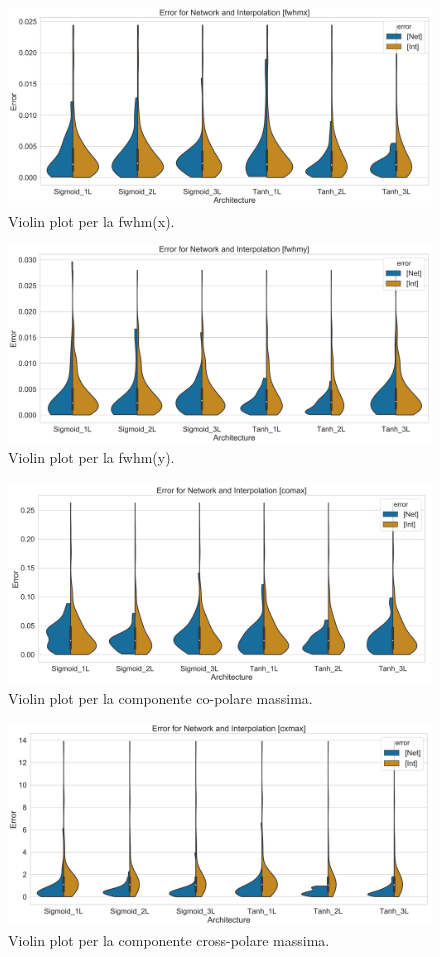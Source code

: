 \documentclass[12pt,a4paper,final]{book}
\begin{document}
\begin{figure}[!ht]
    \centering
    \includegraphics[width=0.8\linewidth]{../figures/violin_plot_fwhmx.png}
    \caption{Violin plot per la fwhm(x).}
    \label{violin_fwhmx}
\end{figure}

\begin{figure}[!ht]
	\centering
	\includegraphics[width=0.8\linewidth]{../figures/violin_plot_fwhmy.png}
	\caption{Violin plot per la fwhm(y).}
	\label{violin_fwhmy}
\end{figure}

\begin{figure}[!ht]
    \centering
    \includegraphics[width=0.8\linewidth]{../figures/violin_plot_comax.png}
    \caption{Violin plot per la componente co-polare massima.}
    \label{violin_comax}
\end{figure}

\begin{figure}[!ht]
	\centering
    \includegraphics[width=0.8\linewidth]{../figures/violin_plot_cxmax.png}
    \caption{Violin plot per la componente cross-polare massima.}
    \label{violin_cxmax}
\end{figure}
\end{document}
